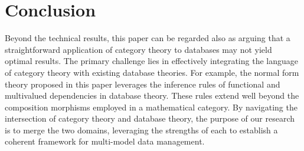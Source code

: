 \section{Conclusion}

Beyond the technical results, this paper can be regarded
also as arguing that a straightforward application of category theory to databases may not yield optimal results. The primary challenge lies in effectively integrating the language of category theory with existing database theories. For example, the normal form theory proposed in this paper leverages the inference rules of functional and multivalued dependencies in database theory. These rules extend well beyond the composition morphisms employed in a mathematical category.  By navigating the intersection of category theory and database theory, the purpose of our research is to merge the two domains, leveraging the strengths of each to establish a coherent framework for multi-model data management.




  

 
 
 
 
 


